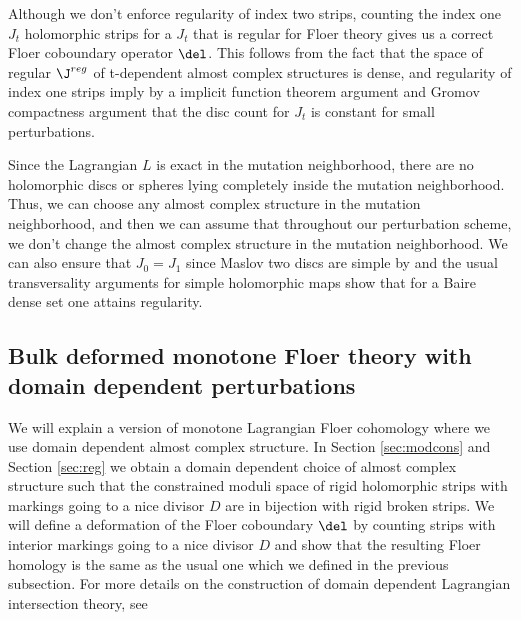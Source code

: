 \noindent Although we don't enforce regularity of index two strips, counting the index one $J_t$ holomorphic strips for a $J_t$ that is regular for Floer theory gives us a correct Floer coboundary operator $\del$. This follows from the fact that the space of regular $\J^{reg}$ of t-dependent almost complex structures is dense, and regularity of index one strips imply by a implicit function theorem argument and Gromov compactness argument that the disc count for $J_t$ is constant for small perturbations. 

\begin{remark}
Since the Lagrangian $L$ is exact in the mutation neighborhood, there are no holomorphic discs or spheres lying completely inside the mutation neighborhood. Thus, we can choose any almost complex structure in the mutation neighborhood, and then we can assume that throughout our perturbation scheme, we don't change the almost complex structure in the mutation neighborhood. We can also ensure that $J_0 = J_1$ since Maslov two discs are simple by \cite{Lazz} and the usual transversality arguments for simple holomorphic maps show that for a Baire dense set one attains regularity.
\end{remark} 

\subsection{Bulk deformed monotone Floer theory with domain dependent perturbations}

We will explain a version of monotone Lagrangian Floer cohomology where we use domain dependent almost complex structure.  In Section \ref{sec:modcons} and Section \ref{sec:reg} we obtain a domain dependent choice of almost complex structure such that the constrained moduli space of rigid holomorphic strips with markings going to a nice divisor $D$ are in bijection with rigid broken strips. We will define a deformation of the Floer coboundary $\del$ by counting strips with interior markings going to a nice divisor $D$ and show that the resulting Floer homology is the same as the usual one which we defined in the previous subsection. For more details on the construction of domain dependent Lagrangian intersection theory, see \cite{charwoodstabil}

